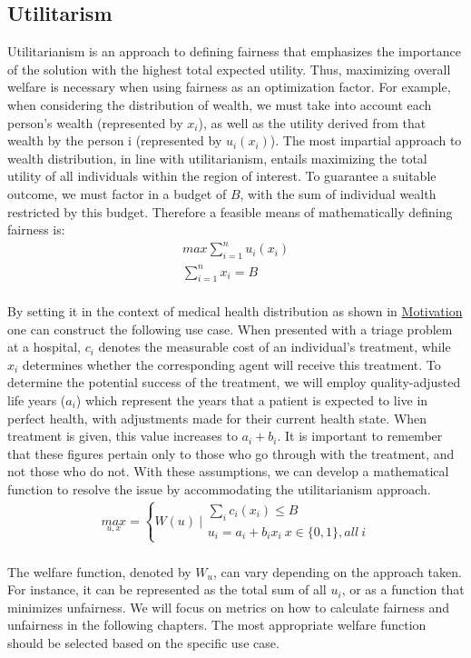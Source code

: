 \documentclass[german, a4paper, 11pt, oneside]{scrbook}
\begin{document}
\subsection{Utilitarism}
Utilitarianism is an approach to defining fairness that emphasizes the importance of the solution with the highest total expected utility. Thus, maximizing overall welfare is necessary when using fairness as an optimization factor. For example, when considering the distribution of wealth, we must take into account each person's wealth (represented by $x_i$), as well as the utility derived from that wealth by the person i (represented by $u_i(x_i)$). The most impartial approach to wealth distribution, in line with utilitarianism, entails maximizing the total utility of all individuals within the region of interest. To guarantee a suitable outcome, we must factor in a budget of $B$, with the sum of individual wealth restricted by this budget. \cite{.,XinyingChen.2023} Therefore a feasible means of mathematically defining fairness is:\\
\begin{align}
   max\sum_{i=1}^{n} u_i(x_i) \\ \sum_{i=1}^{n} x_i = B
\end{align}
\\ \cite{XinyingChen.2023}
By setting it in the context of medical health distribution as shown in \hyperref[sec:motivation]{Motivation} one can construct the following use case. When presented with a triage problem at a hospital, $c_i$ denotes the measurable cost of an individual's treatment, while $x_i$ determines whether the corresponding agent will receive this treatment. To determine the potential success of the treatment, we will employ quality-adjusted life years ($a_i$) which represent the years that a patient is expected to live in perfect health, with adjustments made for their current health state. When treatment is given, this value increases to $a_i + b_i$. It is important to remember that these figures pertain only to those who go through with the treatment, and not those who do not. With these assumptions, we can develop a mathematical function to resolve the issue by accommodating the utilitarianism approach.\cite{XinyingChen.2023} \\
\begin{align}
  \underset{u,x}{max}  = \left\{ W(u)\ | \begin{array}{l}
    \sum_{i} c_i(x_i) \le B\\
    u_i=a_i + b_i x_i \ x \in \{0,1\}, all\ i
  \end{array}\right.
\end{align}
\cite{XinyingChen.2023} \\
The welfare function, denoted by $W_u$, can vary depending on the approach taken. For instance, it can be represented as the total sum of all $u_i$, or as a function that minimizes unfairness. We will focus on metrics on how to calculate fairness and unfairness in the following chapters.
The most appropriate welfare function should be selected based on the specific use case. \cite{XinyingChen.2023}
\end{document}
